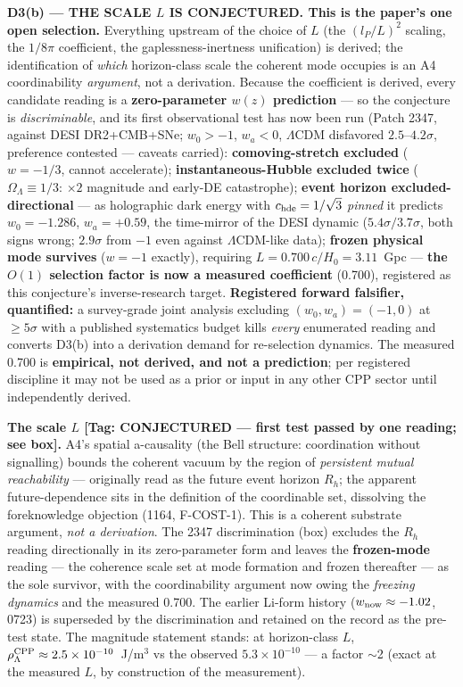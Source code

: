 \documentclass[11pt]{article}
\newcommand{\rL}{\rho_\Lambda}
\newcommand{\Rh}{R_h}
\begin{document}
\begin{mdframed}[linecolor=BrickRed,linewidth=1.2pt]
\textbf{D3(b) --- THE SCALE $L$ IS CONJECTURED. This is the paper's one open selection.} Everything
upstream of the choice of $L$ (the $(l_P/L)^2$ scaling, the $1/8\pi$ coefficient, the
gaplessness-inertness unification) is derived; the identification of \emph{which} horizon-class
scale the coherent mode occupies is an A4 coordinability \emph{argument}, not a derivation. Because
the coefficient is derived, every candidate reading is a \textbf{zero-parameter $w(z)$ prediction}
--- so the conjecture is \emph{discriminable}, and its first observational test has now been run
(Patch 2347, against DESI DR2+CMB+SNe; $w_0>-1$, $w_a<0$, $\Lambda$CDM disfavored
$2.5$--$4.2\sigma$, preference contested --- caveats carried): \textbf{comoving-stretch excluded}
($w=-1/3$, cannot accelerate); \textbf{instantaneous-Hubble excluded twice} ($\Omega_\Lambda\equiv
1/3$: $\times2$ magnitude and early-DE catastrophe); \textbf{event horizon excluded-directional} ---
as holographic dark energy with $c_{\rm hde}=1/\sqrt{3}$ \emph{pinned} it predicts $w_0=-1.286$,
$w_a=+0.59$, the time-mirror of the DESI dynamic ($5.4\sigma/3.7\sigma$, both signs wrong; $2.9\sigma$
from $-1$ even against $\Lambda$CDM-like data); \textbf{frozen physical mode survives} ($w=-1$
exactly), requiring $L = 0.700\,c/H_0 = 3.11$~Gpc --- \textbf{the $O(1)$ selection factor is now a
measured coefficient} (0.700), registered as this conjecture's inverse-research target.
\textbf{Registered forward falsifier, quantified:} a survey-grade joint analysis excluding
$(w_0, w_a) = (-1, 0)$ at $\geq 5\sigma$ with a published systematics budget kills \emph{every}
enumerated reading and converts D3(b) into a derivation demand for re-selection dynamics. The
measured 0.700 is \textbf{empirical, not derived, and not a prediction}; per registered discipline
it may not be used as a prior or input in any other CPP sector until independently derived.
\end{mdframed}

\textbf{The scale $L$ [Tag: CONJECTURED --- first test passed by one reading; see box].} A4's
spatial a-causality (the Bell structure: coordination without signalling) bounds the coherent vacuum
by the region of \emph{persistent mutual reachability} --- originally read as the future event
horizon $\Rh$; the apparent future-dependence sits in the definition of the coordinable set,
dissolving the foreknowledge objection (1164, F-COST-1). This is a coherent substrate argument,
\emph{not a derivation}. The 2347 discrimination (box) excludes the $\Rh$ reading directionally in
its zero-parameter form and leaves the \textbf{frozen-mode} reading --- the coherence scale set at
mode formation and frozen thereafter --- as the sole survivor, with the coordinability argument now
owing the \emph{freezing dynamics} and the measured 0.700. The earlier Li-form history
($w_{\rm now}\approx-1.02$, 0723) is superseded by the discrimination and retained on the record as
the pre-test state. The magnitude statement stands: at horizon-class $L$,
$\rL^{\rm CPP} \approx 2.5\times10^{-10}$~J/m$^3$ vs the observed $5.3\times10^{-10}$ --- a factor
$\sim$2 (exact at the measured $L$, by construction of the measurement).
\end{document}
